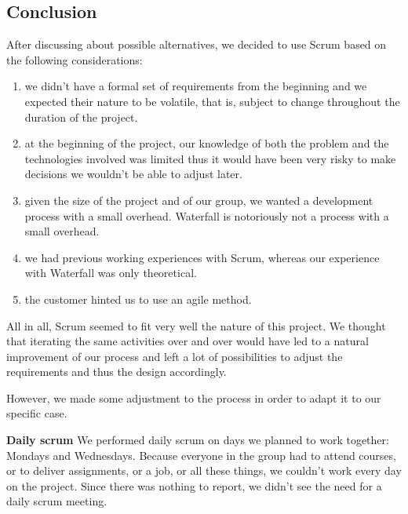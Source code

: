 \subsection{Conclusion}
\label{subsec:devprocess}

After discussing about possible alternatives, we decided to use Scrum based on the following considerations:

\begin{enumerate}
\item we didn't have a formal set of requirements from the beginning and we expected their nature to be volatile, that is, subject to change throughout the duration of the project.

\item at the beginning of the project, our knowledge of both the problem and the technologies involved was limited thus it would have been very risky to make decisions we wouldn't be able to adjust later.

\item given the size of the project and of our group, we wanted a development process with a small overhead. Waterfall is notoriously not a process with a small overhead.

\item we had previous working experiences with Scrum, whereas our experience with Waterfall was only theoretical.

\item the customer hinted us to use an agile method.

\end{enumerate}

All in all, Scrum seemed to fit very well the nature of this project.
We thought that iterating the same activities over and over would have led to a natural improvement of our process and left a lot of possibilities to adjust the requirements and thus the design accordingly.

However, we made some adjustment to the process in order to adapt it to our specific case.

\textbf{Daily scrum}\newline
We performed daily scrum on days we planned to work together: Mondays and Wednesdays.
Because everyone in the group had to attend courses, or to deliver assignments, or a job, or all these things, we couldn't work every day on the project. 
Since there was nothing to report, we didn't see the need for a daily scrum meeting.

